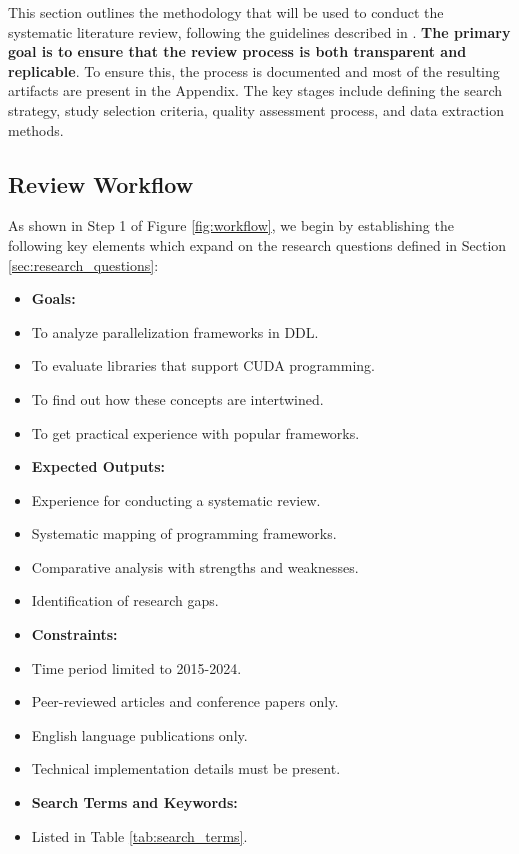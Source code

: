 This section outlines the methodology that will be used to conduct the systematic literature
review, following the guidelines described in
\cite{brereton_lessons_2007-1,kitchenham_procedures_nodate,budgen_reporting_2018,dos_santos_sustainable_2024,keele_systematic_2007}.
\textbf{The primary goal is to ensure that the review process is both transparent and replicable}.
To ensure this, the process is documented and most of the resulting artifacts are present in the
Appendix. The key stages include defining the search strategy, study selection criteria, quality
assessment process, and data extraction methods.

\subsection{Review Workflow}

As shown in Step 1 of Figure \ref{fig:workflow}, we begin by establishing the following key
elements which expand on the research questions defined in Section \ref{sec:research_questions}:

\begin{itemize}
	\item \textbf{Goals:}
	\item To analyze parallelization frameworks in DDL.
	\item To evaluate libraries that support CUDA programming.
	\item To find out how these concepts are intertwined.
	\item To get practical experience with popular frameworks. \\
	\item \textbf{Expected Outputs:}
	\item Experience for conducting a systematic review.
	\item Systematic mapping of programming frameworks.
	\item Comparative analysis with strengths and weaknesses.
	\item Identification of research gaps. \\
	\item \textbf{Constraints:}
	\item Time period limited to 2015-2024.
	\item Peer-reviewed articles and conference papers only.
	\item English language publications only.
	\item Technical implementation details must be present. \\
	\item \textbf{Search Terms and Keywords:}
	\item Listed in Table \ref{tab:search_terms}.
\end{itemize}

